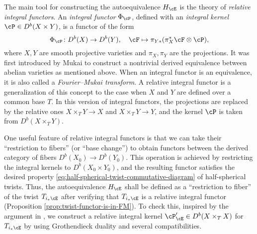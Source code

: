 \documentclass[12pt]{amsart}
\numberwithin{equation}{section}
\theoremstyle{plain}
\theoremstyle{definition}
\begin{document}
The main tool for constructing the autoequivalence $H_{\cE}$ is the theory of \emph{relative integral functors}.
An \emph{integral functor} $\Phi_{\cP}$, defined with an \emph{integral kernel} $\cP \in D^b(X \times Y)$, is a functor of the form
\begin{equation}
    \Phi_{\cP} \colon D^b(X) \to D^b(Y), \quad \cF \mapsto \pi_{Y*}(\pi_X^*\cF \otimes \cP),
\end{equation}
where $X, Y$ are smooth projective varieties and $\pi_X, \pi_Y$ are the projections.
It was first introduced by Mukai \cite{MR607081} to construct a nontrivial derived equivalence between abelian varieties as mentioned above.
When an integral functor is an equivalence, it is also called a \emph{Fourier--Mukai transform}.
A relative integral functor is a generalization of this concept to the case when $X$ and $Y$ are defined over a common base $T$.
In this version of integral functors, the projections are replaced by the relative ones $X \times_T Y \to X$ and $X \times_T Y \to Y$, and the kernel $\cP$ is taken from $D^b(X \times_T Y)$.

One useful feature of relative integral functors is that we can take their ``restriction to fibers'' (or ``base change'') to obtain functors between the derived category of fibers $D^b(X_0) \to D^b(Y_0)$.
This operation is achieved by restricting the integral kernels to $D^b(X_0 \times Y_0)$, and the resulting functor satisfies the desired property \eqref{eq:half-spherical-twist-commutative-diagram} of half-spherical twists.
Thus, the autoequivalence $H_{\cE}$ shall be defined as a ``restriction to fiber'' of the twist $T_{i_*{\cE}}$ after verifying that $T_{i_*{\cE}}$ is a relative integral functor (Proposition \ref{prop:twist-functor-is-in-FM}).
To check this, inspired by the argument in \cite{MR2200048}, we construct a relative integral kernel $\cP'_{\cE} \in D^b(X \times_T X)$ for $T_{i_*{\cE}}$ by using Grothendieck duality and several compatibilities.
\end{document}
